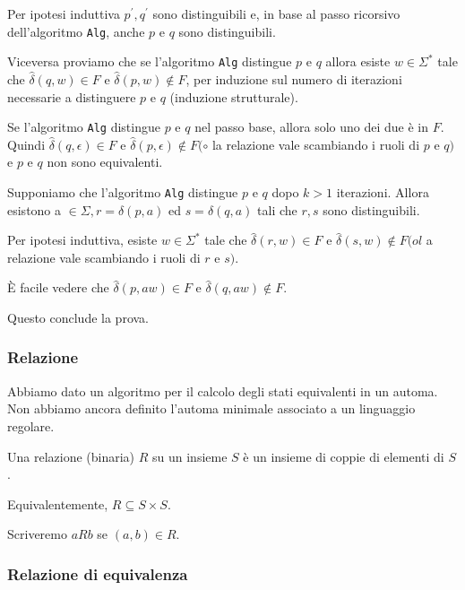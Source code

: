 Per ipotesi induttiva $p^{\prime}, q^{\prime}$ sono distinguibili e, in base al passo ricorsivo dell'algoritmo \texttt{Alg}, anche $p$ e $q$ sono distinguibili.

\vspace{5mm}

Viceversa proviamo che se l'algoritmo \texttt{Alg} distingue $p$ e $q$
allora esiste $w \in \Sigma^{*}$ tale che $\hat{\delta}(q, w) \in F$ e $\hat{\delta}(p, w) \notin F$, per
induzione sul numero di iterazioni necessarie a distinguere $p$ e
$q$ (induzione strutturale).

Se l'algoritmo \texttt{Alg} distingue $p$ e $q$ nel passo base, allora solo
uno dei due è in $F$. Quindi $\hat{\delta}(q, \epsilon) \in F$ e $\hat{\delta}(p, \epsilon) \notin F(\circ$ la
relazione vale scambiando i ruoli di $p$ e $q)$ e $p$ e $q$ non sono
equivalenti.

Supponiamo che l'algoritmo \texttt{Alg} distingue $p$ e $q$ dopo $k>1$
iterazioni. Allora esistono a $\in \Sigma, r=\delta(p, a)$ ed $s=\delta(q, a)$
tali che $r, s$ sono distinguibili.

Per ipotesi induttiva, esiste $w \in \Sigma^{*}$ tale che $\hat{\delta}(r, w) \in F$ e
$\hat{\delta}(s, w) \notin F(o l$ a relazione vale scambiando i ruoli di $r$ e $s)$.

È facile vedere che $\hat{\delta}(p, a w) \in F$ e $\hat{\delta}(q, a w) \notin F .$

Questo conclude la prova.

\subsubsection{Relazione}

Abbiamo dato un algoritmo per il calcolo degli stati
equivalenti in un automa.
Non abbiamo ancora definito l'automa minimale associato a
un linguaggio regolare.

\vspace{4mm}

Una relazione (binaria) $R$ su un insieme $S$ è un insieme di coppie di elementi di $S$.

\vspace{4mm}

Equivalentemente, $R \subseteq S \times S$.

\vspace{4mm}

Scriveremo $a R b$ se $(a, b) \in R$.

\subsubsection{Relazione di equivalenza}

